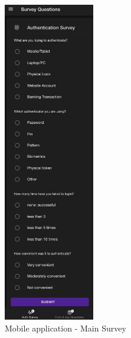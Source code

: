 \begin{figure}
\begin{center}
  \includegraphics[width=150]{images/main-survey.png}
\end{center}
\caption{\label{fig:app-main-survey} Mobile application - Main Survey}
\end{figure}
